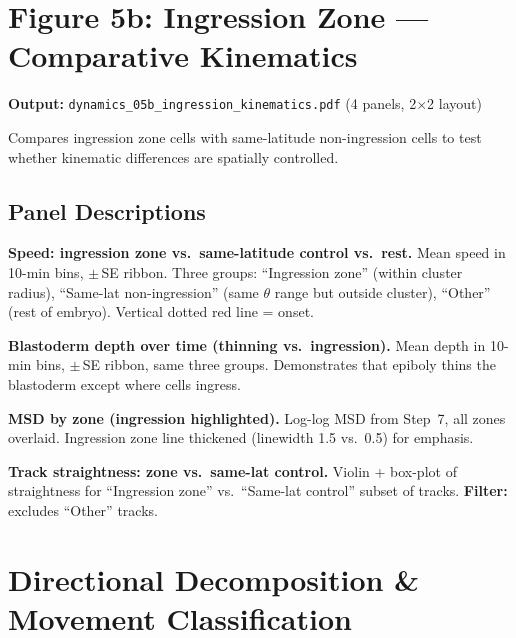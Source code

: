 \documentclass[11pt,a4paper]{article}
\begin{document}
\section*{Figure 5b: Ingression Zone --- Comparative Kinematics}
\label{fig:ingression_kin}

\noindent\textbf{Output:} \texttt{dynamics\_05b\_ingression\_kinematics.pdf}
(4 panels, 2$\times$2 layout)

Compares ingression zone cells with same-latitude non-ingression cells to
test whether kinematic differences are spatially controlled.

\subsection*{Panel Descriptions}

\begin{description}[style=nextline,leftmargin=1.5cm]
  \item[05b-a] \textbf{Speed: ingression zone vs.\ same-latitude control
    vs.\ rest.}
    Mean speed in 10-min bins, $\pm$\,SE ribbon.  Three groups:
    ``Ingression zone'' (within cluster radius), ``Same-lat non-ingression''
    (same $\theta$ range but outside cluster), ``Other'' (rest of embryo).
    Vertical dotted red line = onset.

  \item[05b-b] \textbf{Blastoderm depth over time (thinning vs.\
    ingression).}
    Mean depth in 10-min bins, $\pm$\,SE ribbon, same three groups.
    Demonstrates that epiboly thins the blastoderm except where cells
    ingress.

  \item[05b-c] \textbf{MSD by zone (ingression highlighted).}
    Log-log MSD from Step~7, all zones overlaid.  Ingression zone line
    thickened (linewidth 1.5 vs.\ 0.5) for emphasis.

  \item[05b-d] \textbf{Track straightness: zone vs.\ same-lat control.}
    Violin + box-plot of straightness for ``Ingression zone'' vs.\
    ``Same-lat control'' subset of tracks.
    \textbf{Filter:} excludes ``Other'' tracks.
\end{description}


\setcounter{section}{5}
\section{Directional Decomposition \& Movement Classification}
\label{fig:direction}
\end{document}
